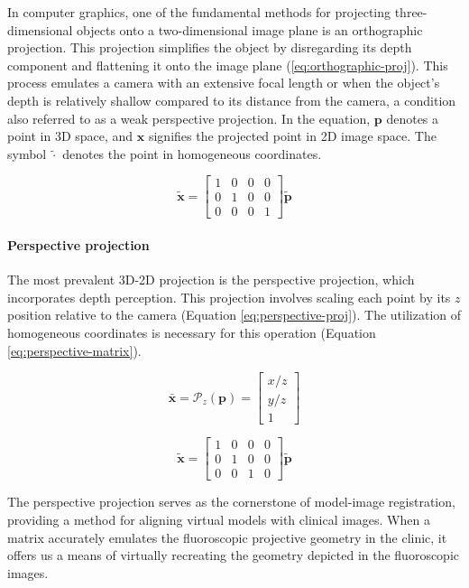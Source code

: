 In computer graphics, one of the fundamental methods for projecting three-dimensional objects onto a two-dimensional image plane is an orthographic projection.
This projection simplifies the object by disregarding its depth component and flattening it onto the image plane (\cref{eq:orthographic-proj}).
This process emulates a camera with an extensive focal length or when the object's depth is relatively shallow compared to its distance from the camera, a condition also referred to as a weak perspective projection.
In the equation, $\mathbf{p}$ denotes a point in 3D space, and $\mathbf{x}$ signifies the projected point in 2D image space. The symbol $\tilde{\cdot}$ denotes the point in homogeneous coordinates.

\begin{equation}
    \tilde{\mathbf{x}} = \begin{bmatrix}
        1 & 0 & 0 & 0 \\ 0 & 1 & 0 & 0 \\ 0 & 0 & 0 & 1
    \end{bmatrix}\tilde{\mathbf{p}}
    \label{eq:orthographic-proj}
\end{equation}

\paragraph*{Perspective projection}
The most prevalent 3D-2D projection is the perspective projection, which incorporates depth perception.
This projection involves scaling each point by its $z$ position relative to the camera (Equation \ref{eq:perspective-proj}).
The utilization of homogeneous coordinates is necessary for this operation (Equation \ref{eq:perspective-matrix}).

\begin{equation}
    \bar{\mathbf{x}} = \mathcal{P}_z(\mathbf{p}) = \begin{bmatrix}
        x/z \\ y/z \\ 1
    \end{bmatrix}
    \label{eq:perspective-proj}
\end{equation}

\begin{equation}
    \tilde{\mathbf{x}} = \begin{bmatrix}
        1 & 0 & 0 & 0 \\ 0 & 1 & 0 & 0 \\ 0 & 0 & 1 & 0 
    \end{bmatrix}\tilde{\mathbf{p}}
    \label{eq:perspective-matrix}
\end{equation}

The perspective projection serves as the cornerstone of model-image registration, providing a method for aligning virtual models with clinical images.
When a matrix accurately emulates the fluoroscopic projective geometry in the clinic, it offers us a means of virtually recreating the geometry depicted in the fluoroscopic images.

